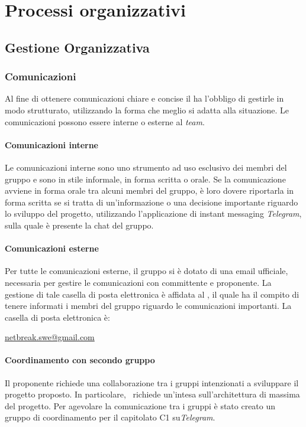 \newpage

\section{Processi organizzativi}

	\subsection{Gestione Organizzativa}
		
		\subsubsection{Comunicazioni}
		Al fine di ottenere comunicazioni chiare e concise il \textit{\RdP} ha l'obbligo di gestirle in modo strutturato, utilizzando la forma che meglio si adatta alla situazione. Le comunicazioni possono essere interne o esterne al \textit{team}.
			
			\paragraph{Comunicazioni interne}
			Le comunicazioni interne sono uno strumento ad uso esclusivo dei membri del gruppo e sono in stile informale, in forma scritta o orale. 
			Se la comunicazione avviene in forma orale tra alcuni membri del gruppo, è loro dovere riportarla in forma scritta se si tratta di un'informazione o una decisione importante riguardo lo sviluppo del progetto, utilizzando l’applicazione di instant messaging \textit{Telegram}, sulla quale è presente la chat del gruppo.

			\paragraph{Comunicazioni esterne}
			Per tutte le comunicazioni esterne, il gruppo \textit{\gruppo} si è dotato di una email ufficiale, necessaria per gestire le comunicazioni con committente e proponente. La gestione di tale casella di posta elettronica è affidata al \textit{\RdP}, il quale ha il compito di tenere informati i membri del gruppo riguardo le comunicazioni importanti. La casella di posta elettronica è:
			\begin{center}
				\url{netbreak.swe@gmail.com} 
			\end{center}
		\paragraph{Coordinamento con secondo gruppo}
			Il proponente richiede una collaborazione tra i gruppi intenzionati a sviluppare il progetto proposto. In particolare, \proponente\ richiede un'intesa sull'architettura di massima del progetto. Per agevolare la comunicazione tra i gruppi è stato creato un gruppo di coordinamento per il capitolato C1 su\textit{Telegram}.
			
